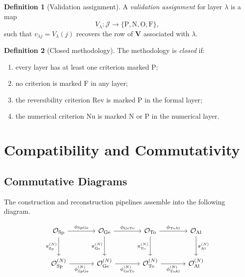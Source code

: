 \documentclass[11pt,a4paper]{article}
\theoremstyle{definition}
\newtheorem{definition}{Definition}[section]
\theoremstyle{plain}
\newcommand{\Sp}{\mathrm{Sp}}
\newcommand{\Ge}{\mathrm{Ge}}
\newcommand{\To}{\mathrm{To}}
\newcommand{\Al}{\mathrm{Al}}
\newcommand{\Ocal}{\mathcal{O}}
\newcommand{\Vmat}{\mathbf{V}}
\newcommand{\Jset}{\mathcal{J}}
\begin{document}
\begin{definition}[Validation assignment]
A \emph{validation assignment} for layer $\lambda$ is a map
\[
  V_\lambda : \Jset \to \{\mathrm{P},\mathrm{N},\mathrm{O},\mathrm{F}\},
\]
such that $v_{\lambda j} = V_\lambda(j)$ recovers the row of $\Vmat$
associated with $\lambda$.
\end{definition}

\begin{definition}[Closed methodology]
The methodology is \emph{closed} if:
\begin{enumerate}[label=(\alph*)]
  \item every layer has at least one criterion marked $\mathrm{P}$;
  \item no criterion is marked $\mathrm{F}$ in any layer;
  \item the reversibility criterion $\mathrm{Rev}$ is marked
        $\mathrm{P}$ in the formal layer;
  \item the numerical criterion $\mathrm{Nu}$ is marked
        $\mathrm{N}$ or $\mathrm{P}$ in the numerical layer.
\end{enumerate}
\end{definition}

\section{Compatibility and Commutativity}\label{sec:compat}

\subsection{Commutative Diagrams}

The construction and reconstruction pipelines assemble into the
following diagram.

\begin{equation}\label{eq:bigdiagram}
\begin{tikzcd}[row sep=large, column sep=large]
  \Ocal_\Sp \arrow[r,"\phi_{\Sp\Ge}"] \arrow[d, "\pi^{(N)}_{\Sp}"']
    & \Ocal_\Ge \arrow[r,"\phi_{\Ge\To}"] \arrow[d, "\pi^{(N)}_{\Ge}"']
    & \Ocal_\To \arrow[r,"\phi_{\To\Al}"] \arrow[d, "\pi^{(N)}_{\To}"']
    & \Ocal_\Al \arrow[d, "\pi^{(N)}_{\Al}"] \\
  \Ocal^{(N)}_\Sp \arrow[r, "\phi^{(N)}_{\Sp\Ge}"']
    & \Ocal^{(N)}_\Ge \arrow[r, "\phi^{(N)}_{\Ge\To}"']
    & \Ocal^{(N)}_\To \arrow[r, "\phi^{(N)}_{\To\Al}"']
    & \Ocal^{(N)}_\Al
\end{tikzcd}
\end{equation}
\end{document}

